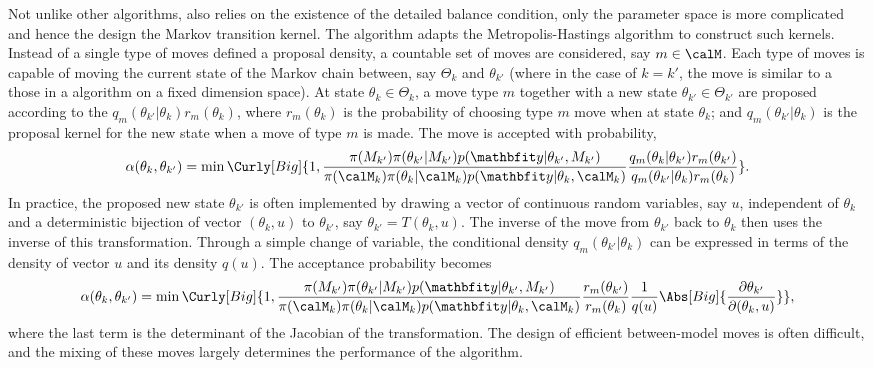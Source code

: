 Not unlike other \mcmc algorithms, \rjmcmc also relies on the existence of the
detailed balance condition, only the parameter space is more complicated and
hence the design the Markov transition kernel. The \rjmcmc algorithm adapts
the Metropolis-Hastings algorithm to construct such kernels. Instead of a
single type of moves defined a proposal density, a countable set of moves are
considered, say $m\in\calM$. Each type of moves is capable of moving the
current state of the Markov chain between, say $\Theta_k$ and $\theta_{k'}$
(where in the case of $k = k'$, the move is similar to a those in a \mcmc
algorithm on a fixed dimension space). At state $\theta_k\in\Theta_k$, a move
type $m$ together with a new state $\theta_{k'}\in\Theta_{k'}$ are proposed
according to the $q_m(\theta_{k'}|\theta_k)r_m(\theta_k)$, where
$r_m(\theta_k)$ is the probability of choosing type $m$ move when at state
$\theta_k$; and $q_m(\theta_{k'}|\theta_k)$ is the proposal kernel for the new
state when a move of type $m$ is made. The move is accepted with probability,
\begin{equation}
  \alpha(\theta_k,\theta_{k'}) =
  \min\Curly[Big]{1,
    \frac{\pi(M_{k'})\pi(\theta_{k'}|M_{k'})p(\data|\theta_{k'},M_{k'})}
    {\pi(\calM_k)\pi(\theta_k|\calM_k)p(\data|\theta_k,\calM_k)}
    \frac{q_m(\theta_k|\theta_{k'})r_m(\theta_{k'})}
    {q_m(\theta_{k'}|\theta_k)r_m(\theta_k)}
  }.
\end{equation}
In practice, the proposed new state $\theta_{k'}$ is often implemented by
drawing a vector of continuous random variables, say $u$, independent of
$\theta_k$ and a deterministic bijection of vector $(\theta_k,u)$ to
$\theta_{k'}$, say $\theta_{k'} = T(\theta_k,u)$. The inverse of the move from
$\theta_{k'}$ back to $\theta_k$ then uses the inverse of this transformation.
Through a simple change of variable, the conditional density
$q_m(\theta_{k'}|\theta_k)$ can be expressed in terms of the density of vector
$u$ and its density $q(u)$. The acceptance probability becomes
\begin{equation}
  \alpha(\theta_k,\theta_{k'}) =
  \min\Curly[Big]{1,
    \frac{\pi(M_{k'})\pi(\theta_{k'}|M_{k'})p(\data|\theta_{k'},M_{k'})}
    {\pi(\calM_k)\pi(\theta_k|\calM_k)p(\data|\theta_k,\calM_k)}
    \frac{r_m(\theta_{k'})}{r_m(\theta_k)}
    \frac{1}{q(u)}\Abs[Big]{\frac{\partial\theta_{k'}}{\partial(\theta_k,u)}}
  },
\end{equation}
where the last term is the determinant of the Jacobian of the transformation.
The design of efficient between-model moves is often difficult, and the mixing
of these moves largely determines the performance of the algorithm.


